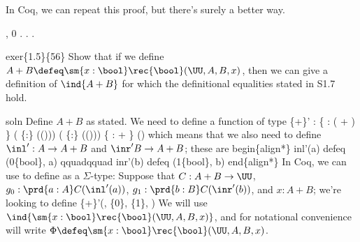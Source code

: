 In Coq, we can repeat this proof, but there's surely a better way.
\begin{coqdoccode}
\coqdocnoindent
{} \coqdockw{\ensuremath{\forall}}   ,     0 \coqdocnotation{=} . . .\coqdoceol
\coqdocemptyline
\end{coqdoccode}
exer\{1.5\}\{56\}  Show that if we define $A + B \defeq \sm{x:\bool}
\rec{\bool}(\UU, A, B, x)$, then we can give a definition of $\ind{A+B}$ for
which the definitional equalities stated in S1.7 hold.


soln  Define $A+B$ as stated.  We need to define a function of type
  \{+\}' : \{ : ( + )  \}
               ( \{:\} (()))
               ( \{:\} (()))
               \{ :  + \} ()
which means that we also need to define $\inl' : A \to A + B$ and $\inr' B \to
A + B$; these are
begin\{align*\}
  inl'(a) defeq (0\{bool\}, a)
  qquadqquad
  inr'(b) defeq (1\{bool\}, b)
end\{align*\}
In Coq, we can use  to define  as a
$\Sigma$-type:
Suppose that $C : A + B \to \UU$, $g_{0} : \prd{a:A} C(\inl'(a))$, $g_{1} :
\prd{b:B} C(\inr'(b))$, and $x : A+B$; we're looking to define
  \{+\}'(, \{0\}, \{1\}, )
We will use $\ind{\sm{x:\bool}\rec{\bool}(\UU, A, B, x)}$, and for notational
convenience will write $\Phi \defeq \sm{x:\bool}\rec{\bool}(\UU, A, B, x)$.
